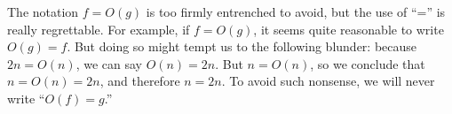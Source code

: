 The notation $f = O(g)$ is too firmly entrenched to avoid, but the use of
``='' is really regrettable.  For example, if $f = O(g)$, it seems quite
reasonable to write $O(g) = f$.  But doing so might tempt us to the
following blunder: because $2n = O(n)$, we can say $O(n) = 2n$.  But $n =
O(n)$, so we conclude that $n = O(n) = 2n$, and therefore $n = 2n$.  To
avoid such nonsense, we will never write ``$O(f) = g$.''

\begin{problems}
\practiceproblems
{}

\homeworkproblems
{}

\classproblems
{}
\end{problems}


\endinput
